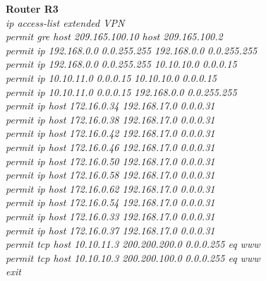 \documentclass[a4paper, 12pt]{article}
\begin{document}
\hspace*{1cm}\textbf{Router R3}	\\
\hspace*{2cm}\textit{ip access-list extended VPN\\
\hspace*{2cm}permit gre host 209.165.100.10 host 209.165.100.2\\
\hspace*{2cm} permit ip 192.168.0.0 0.0.255.255 192.168.0.0 0.0.255.255\\
\hspace*{2cm} permit ip 192.168.0.0 0.0.255.255 10.10.10.0 0.0.0.15\\
\hspace*{2cm} permit ip 10.10.11.0 0.0.0.15 10.10.10.0 0.0.0.15\\
\hspace*{2cm} permit ip 10.10.11.0 0.0.0.15 192.168.0.0 0.0.255.255\\
\hspace*{2cm} permit ip host 172.16.0.34 192.168.17.0 0.0.0.31\\
\hspace*{2cm} permit ip host 172.16.0.38 192.168.17.0 0.0.0.31\\
\hspace*{2cm} permit ip host 172.16.0.42 192.168.17.0 0.0.0.31\\
\hspace*{2cm} permit ip host 172.16.0.46 192.168.17.0 0.0.0.31\\
\hspace*{2cm} permit ip host 172.16.0.50 192.168.17.0 0.0.0.31\\
\hspace*{2cm} permit ip host 172.16.0.58 192.168.17.0 0.0.0.31\\
\hspace*{2cm} permit ip host 172.16.0.62 192.168.17.0 0.0.0.31\\
\hspace*{2cm} permit ip host 172.16.0.54 192.168.17.0 0.0.0.31\\
\hspace*{2cm} permit ip host 172.16.0.33 192.168.17.0 0.0.0.31\\
\hspace*{2cm} permit ip host 172.16.0.37 192.168.17.0 0.0.0.31\\
\hspace*{2cm}permit tcp host 10.10.11.3 200.200.200.0 0.0.0.255 eq www\\
\hspace*{2cm}permit tcp host 10.10.10.3 200.200.100.0 0.0.0.255 eq www\\
\hspace*{2cm}exit\\}
\end{document}
